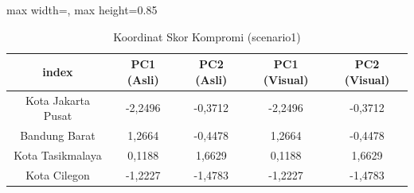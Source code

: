 \begin{table}[H]
\centering
\caption{Koordinat Skor Kompromi (scenario1)} \label{tab:sample1scores}
\begin{adjustbox}{max width=\textwidth, max height=0.85\textheight}
\begin{tabular}{|c|c|c|c|c|}
\hline
\textbf{index} & \textbf{PC1 (Asli)} & \textbf{PC2 (Asli)} & \textbf{PC1 (Visual)} & \textbf{PC2 (Visual)} \\
\hline
Kota Jakarta Pusat & -2,2496 & -0,3712 & -2,2496 & -0,3712 \\
Bandung Barat & 1,2664 & -0,4478 & 1,2664 & -0,4478 \\
Kota Tasikmalaya & 0,1188 & 1,6629 & 0,1188 & 1,6629 \\
Kota Cilegon & -1,2227 & -1,4783 & -1,2227 & -1,4783 \\
\hline
\end{tabular}
\end{adjustbox}
\end{table}